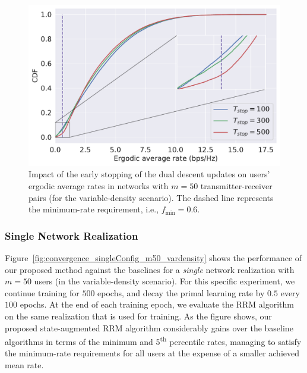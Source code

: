 \documentclass[lettersize,journal]{IEEEtran}
\begin{document}
\begin{figure}[h]
\centering
\includegraphics[width=.95\columnwidth]{fig_early_stopping_m50_vardensity_T500.pdf}
\caption{Impact of the early stopping of the dual descent updates on users' ergodic average rates in networks with $m=50$ transmitter-receiver pairs (for the variable-density scenario). The dashed line represents the minimum-rate requirement, i.e., $f_{\min}=0.6$.}
\label{fig:early_stopping_m50_vardensity_T500}
\end{figure}



\subsubsection{Single Network Realization}\label{sec:single_network}
Figure~\ref{fig:convergence_singleConfig_m50_vardensity} shows the performance of our proposed method against the baselines for a \emph{single} network realization with $m=50$ users (in the variable-density scenario). For this specific experiment, we continue training for $500$ epochs, and decay the primal learning rate by $0.5$ every $100$ epochs. At the end of each training epoch, we evaluate the RRM algorithm on the same realization that is used for training. As the figure shows, our proposed state-augmented RRM algorithm considerably gains over the baseline algorithms in terms of the minimum and 5\textsuperscript{th} percentile rates, managing to satisfy the minimum-rate requirements for all users at the expense of a smaller achieved mean rate.
\end{document}
